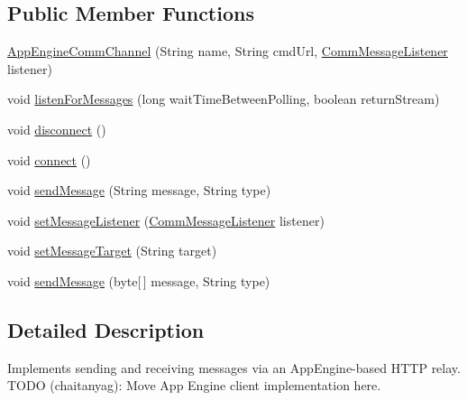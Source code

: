 \subsection*{Public Member Functions}
\begin{DoxyCompactItemize}
\item 
\hyperlink{classcom_1_1cellbots_1_1communication_1_1_app_engine_comm_channel_a0c6bd96e7dafbb51c40cdf74315fd0a8}{App\-Engine\-Comm\-Channel} (String name, String cmd\-Url, \hyperlink{interfacecom_1_1cellbots_1_1communication_1_1_abstract_comm_channel_1_1_comm_message_listener}{Comm\-Message\-Listener} listener)
\item 
void \hyperlink{classcom_1_1cellbots_1_1communication_1_1_app_engine_comm_channel_aacdbec353ac5ddec91052357964c7108}{listen\-For\-Messages} (long wait\-Time\-Between\-Polling, boolean return\-Stream)
\item 
void \hyperlink{classcom_1_1cellbots_1_1communication_1_1_app_engine_comm_channel_a11e151aef424b1d9a4aa4c968072ca69}{disconnect} ()
\item 
void \hyperlink{classcom_1_1cellbots_1_1communication_1_1_app_engine_comm_channel_a980ad644ceb0ff0f5dc551a6751188b3}{connect} ()
\item 
void \hyperlink{classcom_1_1cellbots_1_1communication_1_1_app_engine_comm_channel_ae50aa139ee31bbb3c9e5dfde466a0215}{send\-Message} (String message, String type)
\item 
void \hyperlink{classcom_1_1cellbots_1_1communication_1_1_app_engine_comm_channel_a512bceeb6c68a7dfb0d34ba9b8de8303}{set\-Message\-Listener} (\hyperlink{interfacecom_1_1cellbots_1_1communication_1_1_abstract_comm_channel_1_1_comm_message_listener}{Comm\-Message\-Listener} listener)
\item 
void \hyperlink{classcom_1_1cellbots_1_1communication_1_1_app_engine_comm_channel_a28c7b95310b523f66a57cf1be270bd08}{set\-Message\-Target} (String target)
\item 
void \hyperlink{classcom_1_1cellbots_1_1communication_1_1_app_engine_comm_channel_ac8a1b528351e084b5554916e11e9a1f4}{send\-Message} (byte\mbox{[}$\,$\mbox{]} message, String type)
\end{DoxyCompactItemize}


\subsection{Detailed Description}
Implements sending and receiving messages via an App\-Engine-\/based H\-T\-T\-P relay. T\-O\-D\-O (chaitanyag)\-: Move App Engine client implementation here.

